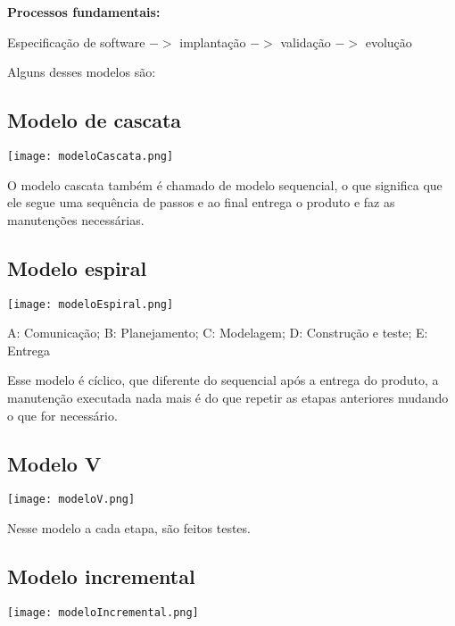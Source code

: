 \documentclass{article}
\begin{document}
\noindent
\textbf{Processos fundamentais:}

Especificação de software $->$ implantação $->$
validação $->$ evolução

\noindent
Alguns desses modelos são:

\subsection*{Modelo de cascata}

\begin{center}
    \texttt{[image: modeloCascata.png]}
\end{center}

O modelo cascata também é chamado de modelo sequencial, o que significa
que ele segue uma sequência de passos e ao final entrega o produto e faz
as manutenções necessárias.

\subsection*{Modelo espiral}

\begin{center}
    \texttt{[image: modeloEspiral.png]}
\end{center}

A: Comunicação;
B: Planejamento;
C: Modelagem;
D: Construção e teste;
E: Entrega

Esse modelo é cíclico, que diferente do sequencial
após a entrega do produto, a manutenção executada nada mais é 
do que repetir as etapas anteriores mudando o que for necessário.

\subsection*{Modelo V}

\begin{center}
    \texttt{[image: modeloV.png]}
\end{center}

Nesse modelo a cada etapa, são feitos
testes.

\subsection*{Modelo incremental}

\begin{center}
    \texttt{[image: modeloIncremental.png]}
\end{center}
\end{document}
